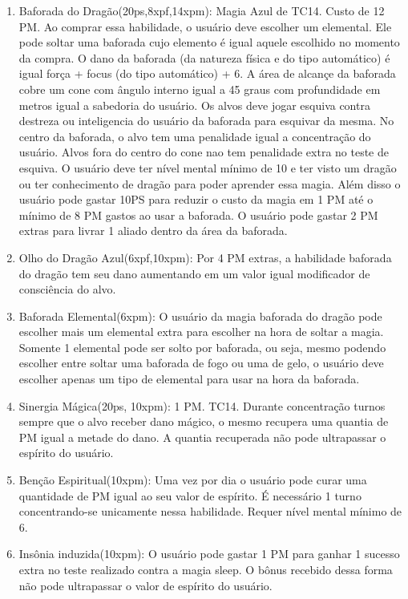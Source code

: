 \begin{enumerate}
	\item Baforada do Dragão(20ps,8xpf,14xpm): Magia Azul de TC14. Custo de 12 PM.\newline
	Ao comprar essa habilidade, o usuário deve escolher um elemental. Ele pode soltar uma baforada cujo elemento é igual aquele escolhido no momento da compra. O dano da baforada (da natureza física e do tipo automático) é igual força + focus (do tipo automático) + 6. A área de alcançe da baforada cobre um cone com ângulo interno igual a 45 graus com profundidade em metros igual a sabedoria do usuário. 
	Os alvos deve jogar esquiva contra destreza ou inteligencia do usuário da baforada para esquivar da mesma.
	No centro da baforada, o alvo tem uma penalidade igual a concentração do usuário. Alvos fora do centro do cone nao tem penalidade extra no teste de esquiva. 
	O usuário deve ter nível mental mínimo de 10 e ter visto um dragão ou ter conhecimento de dragão para poder aprender essa magia. Além disso o usuário pode gastar 10PS para reduzir o custo da magia em 1 PM até o mínimo de 8 PM gastos ao usar a baforada. O usuário pode gastar 2 PM extras para livrar 1 aliado dentro da área da baforada.
	
	\item Olho do Dragão Azul(6xpf,10xpm): Por 4 PM extras, a habilidade baforada do dragão tem seu dano aumentando em um valor igual modificador de consciência do alvo.
	
	\item Baforada Elemental(6xpm): O usuário da magia baforada do dragão pode escolher mais um elemental extra para escolher na hora de soltar a magia. Somente 1 elemental pode ser solto por baforada, ou seja, mesmo podendo escolher entre soltar uma baforada de fogo ou uma de gelo, o usuário deve escolher apenas um tipo de elemental para usar na hora da baforada.

	\item Sinergia Mágica(20ps, 10xpm): 1 PM. TC14. \newline
Durante concentração turnos sempre que o alvo receber dano mágico, o mesmo recupera uma quantia de PM igual a metade do dano. A quantia recuperada não pode ultrapassar o espírito do usuário.

	\item Benção Espiritual(10xpm): Uma vez por dia o usuário pode curar uma quantidade de PM igual ao seu valor de espírito. É necessário 1 turno concentrando-se unicamente nessa habilidade. Requer nível mental mínimo de 6.

	\item Insônia induzida(10xpm): O usuário pode gastar 1 PM para ganhar 1 sucesso extra no teste realizado contra a magia sleep. O bônus recebido dessa forma não pode ultrapassar o valor de espírito do usuário.
	

\end{enumerate}
